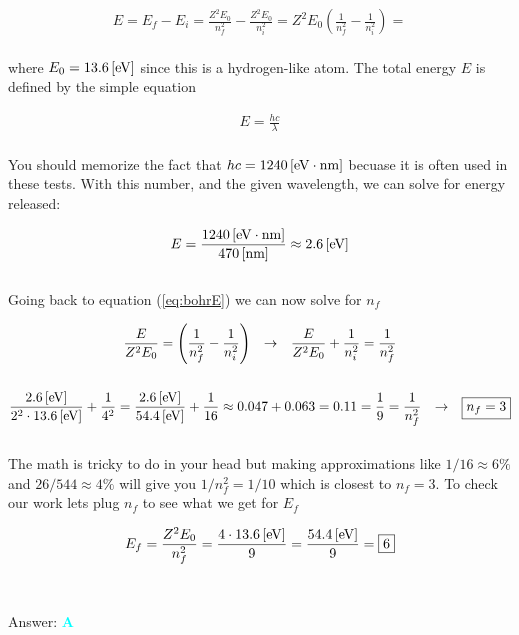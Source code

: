 \documentclass{article}
\begin{document}
\begin{gather}
\label{eq:bohrE}E = E_{f} - E_{i} = \frac{Z^{2}E_{0}}{n_{f}^{2}} - \frac{Z^{2}E_{0}}{n_{i}^{2}} = Z^{2}E_{0} \left(  \frac{1}{n_{f}^{2}}  - \frac{1}{n_{i}^{2}} \right) = 
\end{gather}
\\
where $E_{0} = \unit[13.6]{[eV]}$ since this is a hydrogen-like atom. The total energy $E$ is defined by the simple equation

\begin{gather}
\label{eq: Energywave}E = \frac{hc}{\lambda}
\end{gather}
\\
You should memorize the fact that $hc = \unit[1240]{[eV \cdot nm]}$ becuase it is often used in these tests. With this number, and the given wavelength, we can solve for energy released:

\begin{gather}
E = \frac{\unit[1240]{[eV \cdot nm]}}{\unit[470]{[nm]}} \approx \unit[2.6]{[eV]}\nonumber
\end{gather}
\\
Going back to equation (\ref{eq:bohrE}) we can now solve for $n_{f}$

\begin{gather}
\frac{E}{Z^{2}E_{0} } = \left(  \frac{1}{n_{f}^{2}}  - \frac{1}{n_{i}^{2}} \right)\hspace{.1in} \rightarrow \hspace{.1in} \frac{E}{Z^{2}E_{0} } + \frac{1}{n_{i}^{2}} = \frac{1}{n_{f}^{2}}\nonumber\\
\nonumber\\
\frac{\unit[2.6]{[eV]}}{2^{2} \cdot \unit[13.6]{[eV]} } + \frac{1}{4^{2}} = \frac{\unit[2.6]{[eV]}}{\unit[54.4]{[eV]}} + \frac{1}{16}  \approx 0.047 + 0.063 = 0.11 = \frac{1}{9} = \frac{1}{n_{f}^{2}} \hspace{.1in}\rightarrow \hspace{.1in} \boxed{n_{f} = 3}\nonumber
\end{gather}
\\
The math is tricky to do in your head but making approximations like $1/16 \approx 6\%$ and $26/544 \approx 4\%$ will give you $1/n_{f}^{2} = 1/10$ which is closest to $n_{f} = 3$. To check our work lets plug $n_{f}$ to see what we get for $E_{f}$

\begin{gather}
E_{f} = \frac{Z^{2}E_{0}}{n_{f}^{2}}= \frac{4 \cdot \unit[13.6]{[eV]}}{9} = \frac{\unit[54.4]{[eV]}}{9} = \boxed{6}\nonumber
\end{gather}
\\\\
Answer: \textbf{\textcolor{cyan}A}\\
\end{document}

